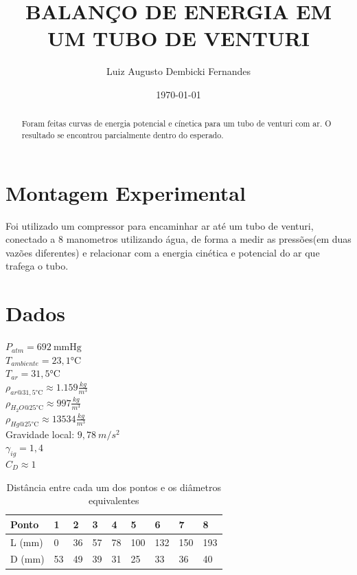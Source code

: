\documentclass[12pt, a4]{article}
\begin{document}
\title{BALANÇO DE ENERGIA EM UM TUBO DE VENTURI}
\author{Luiz Augusto Dembicki Fernandes}
\date{\today}

\maketitle

\begin{abstract}
Foram feitas curvas de energia potencial e cínetica para um tubo de venturi com ar.
O resultado se encontrou parcialmente dentro do esperado.
\end{abstract}

\section{Montagem Experimental}

\tab  Foi utilizado um compressor para encaminhar ar até um tubo de venturi, 
conectado a 8 manometros utilizando água, de forma a medir as pressões(em duas vazões diferentes)
e relacionar com a energia cinética e potencial do ar que trafega o tubo.

\section{Dados}
$ P_{atm} = 692 \ \si{\mmHg} $ \\
$ T_{ambiente} =  23,1 \si{\celsius} $ \\
$ T_{ar} =  31,5 \si{\celsius} $ \\
$ \rho_{ar@31,5 \si{\celsius}} \approx 1.159 \frac{\si{kg}}{\si{m}^3} $ \\
$ \rho_{H_2O@25 \si{\celsius}} \approx 997 \frac{\si{kg}}{\si{m}^3} $ \\
$ \rho_{Hg@25 \si{\celsius}} \approx 13534 \frac{\si{kg}}{\si{m}^3} $ \\
Gravidade local: $ 9,78 \ m/s^2 $ \\
$ \gamma_{ig} = 1,4 $ \\
$ C_D \approx 1 $
\begin{table}[H]
        \begin{tabular}{|l|l|l|l|l|l|l|l|l|}
        \hline
        Ponto  & 1  & 2  & 3  & 4  & 5   & 6   & 7   & 8   \\ \hline
        L (mm) & 0  & 36 & 57 & 78 & 100 & 132 & 150 & 193 \\ \hline
        D (mm) & 53 & 49 & 39 & 31 & 25  & 33  & 36  & 40  \\ \hline
        \end{tabular}
    \caption{Distância entre cada um dos pontos e os diâmetros equivalentes}
\end{table}
\end{document}
